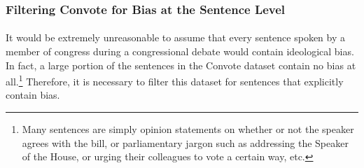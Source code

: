 \documentclass[10pt,a4paper,onecolumn]{article}
\begin{document}
\subsubsection{Filtering Convote for Bias at the Sentence Level}
\label{sec:filtering}
\paragraph{}
It would be extremely unreasonable to assume that every sentence spoken by a member of congress during a congressional debate would contain ideological bias. In fact, a large portion of the sentences in the Convote dataset contain no bias at all.\footnote{Many sentences are simply opinion statements on whether or not the speaker agrees with the bill, or parliamentary jargon such as addressing the Speaker of the House, or urging their colleagues to vote a certain way, etc.} Therefore, it is necessary to filter this dataset for sentences that explicitly contain bias. 
\end{document}
